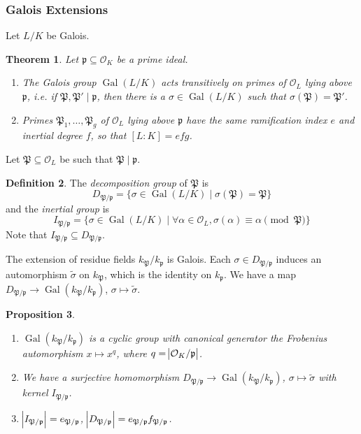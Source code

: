\documentclass[11pt]{article}
\theoremstyle{definition}
\newtheorem{definition}{Definition}[section]
\theoremstyle{plain}
\newtheorem{theorem}[definition]{Theorem}
\newtheorem{proposition}[definition]{Proposition}
\theoremstyle{remark}
\DeclareMathOperator{\Gal}{Gal}
\newcommand{\cO}{\mathcal{O}}
\newcommand{\cp}{\mathfrak{P}}
\newcommand{\fp}{\mathfrak{p}}
\begin{document}
\subsubsection*{Galois Extensions}

Let $L/K$ be Galois.

\begin{theorem}\label{thm:1_2}
    Let $\fp \subseteq \cO_K$ be a prime ideal.
    \begin{enumerate}
        \item The Galois group $\Gal(L/K)$ acts transitively on primes of $\cO_L$ lying above $\fp$, i.e. if $\cp, \cp' \mid \fp$, then there is a $\sigma \in \Gal(L/K)$ such that $\sigma(\cp) = \cp'$.

        \item Primes $\cp_1, \ldots, \cp_g$ of $\cO_L$ lying above $\fp$ have the same ramification index $e$ and inertial degree $f$, so that $[L : K] = e f g$.
    \end{enumerate}
\end{theorem}

\noindent Let $\cp \subseteq \cO_L$ be such that $\cp \mid \fp$.

\begin{definition}
    The \emph{decomposition group} of $\cp$ is
    \begin{equation*}
        D_{\cp / \fp} = \{\sigma \in \Gal(L/K) \mid \sigma(\cp) = \cp\}
    \end{equation*}
    and the \emph{inertial group} is
    \begin{equation*}
        I_{\cp / \fp} = \{\sigma \in \Gal(L/K) \mid \forall \alpha \in \cO_L, \sigma(\alpha) \equiv \alpha \pmod{\cp}\}
    \end{equation*}
    Note that $I_{\cp/\fp} \subseteq D_{\cp/\fp}$.
\end{definition}

The extension of residue fields $k_\cp / k_\fp$ is Galois. Each $\sigma \in D_{\cp / \fp}$ induces an automorphism $\widetilde{\sigma}$ on $k_\cp$, which is the identity on $k_\fp$. We have a map $D_{\cp / \fp} \to \Gal(k_\cp / k_\fp)$, $\sigma \mapsto \widetilde{\sigma}$.

\begin{proposition}\label{prop:1_4}\phantom{}
    \begin{enumerate}
        \item $\Gal(k_\cp / k_\fp)$ is a cyclic group with canonical generator the Frobenius automorphism $x \mapsto x^q$, where $q = \abs{\cO_K / \fp}$.

        \item We have a surjective homomorphism $D_{\cp / \fp} \to \Gal(k_\cp / k_\fp)$, $\sigma \mapsto \widetilde{\sigma}$ with kernel $I_{\cp / \fp}$.

        \item $\abs{I_{\cp / \fp}} = e_{\cp / \fp}$, $\abs{D_{\cp / \fp}} = e_{\cp / \fp} f_{\cp / \fp}$.
    \end{enumerate}
\end{proposition}
\end{document}
